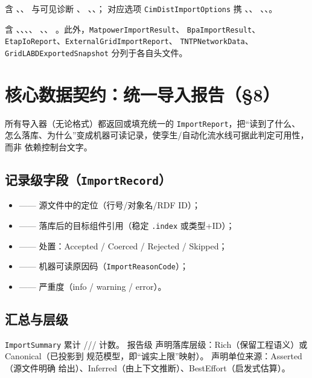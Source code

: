 \documentclass[UTF8,fontset=fandol,a4paper,11pt]{ctexart}
\begin{document}
含 、、 与可见诊断 、
、、；
对应选项 \texttt{CimDistImportOptions} 携 、、
、、。

含 、、、、
、、
。此外，\texttt{MatpowerImportResult}、
\texttt{BpaImportResult}、\texttt{EtapIoReport}、\texttt{ExternalGridImportReport}、
\texttt{TNTPNetworkData}、\texttt{GridLABDExported\allowbreak Snapshot} 分列于各自头文件。

\section{核心数据契约：统一导入报告（§8）}
所有导入器（无论格式）都返回或填充统一的 \texttt{ImportReport}，把“读到了什么、
怎么落库、为什么”变成机器可读记录，使孪生/自动化流水线可据此判定可用性，而非
依赖控制台文字。

\subsection{记录级字段（\texttt{ImportRecord}）}
\begin{itemize}
  \item {} —— 源文件中的定位（行号/对象名/RDF ID）；
  \item {} —— 落库后的目标组件引用（稳定 \texttt{.index} 或类型+ID）；
  \item {} —— 处置：Accepted / Coerced / Rejected / Skipped；
  \item {} —— 机器可读原因码（\texttt{ImportReasonCode}）；
  \item {} —— 严重度（info / warning / error）。
\end{itemize}

\subsection{汇总与层级}
\texttt{ImportSummary} 累计 /// 计数。
报告级  声明落库层级：Rich（保留工程语义）或 Canonical（已投影到
规范模型，即“诚实上限”映射）。 声明单位来源：Asserted（源文件明确
给出）、Inferred（由上下文推断）、BestEffort（启发式估算）。
\end{document}

